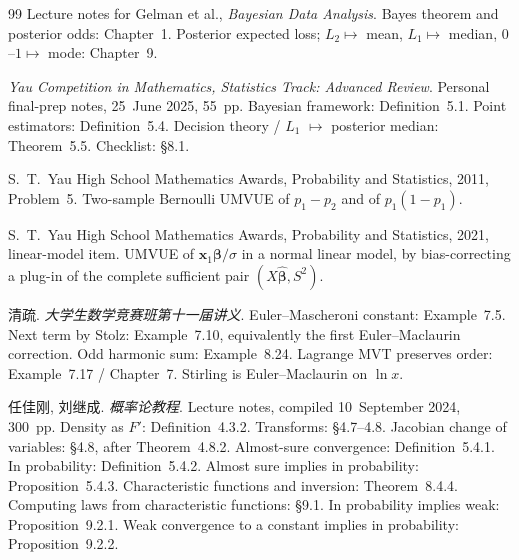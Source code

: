 \documentclass[11pt,a4paper]{article}
\begin{document}
\begin{thebibliography}{99}
Lecture notes for Gelman et al., \emph{Bayesian Data Analysis}.
\newblock Bayes theorem and posterior odds: Chapter~1. Posterior expected loss; \(L_2\mapsto\) mean, \(L_1\mapsto\) median, \(0\)--\(1\mapsto\) mode: Chapter~9.

\textit{Yau Competition in Mathematics, Statistics Track: Advanced Review}.
\newblock Personal final-prep notes, 25~June 2025, 55~pp.
\newblock Bayesian framework: Definition~5.1. Point estimators: Definition~5.4. Decision theory / \(L_1\) \(\mapsto\) posterior median: Theorem~5.5. Checklist: \S8.1.

S.~T.~Yau High School Mathematics Awards, Probability and Statistics, 2011, Problem~5.
\newblock Two-sample Bernoulli UMVUE of \(p_1-p_2\) and of \(p_1(1-p_1)\).

S.~T.~Yau High School Mathematics Awards, Probability and Statistics, 2021, linear-model item.
\newblock UMVUE of \(\mathbf{x}_1\boldsymbol{\beta}/\sigma\) in a normal linear model, by bias-correcting a plug-in of the complete sufficient pair \((X\hat{\boldsymbol{\beta}},S^2)\).

清疏.
\newblock \emph{大学生数学竞赛班第十一届讲义}.
\newblock Euler--Mascheroni constant: Example~7.5. Next term by Stolz: Example~7.10, equivalently the first Euler--Maclaurin correction. Odd harmonic sum: Example~8.24. Lagrange MVT preserves order: Example~7.17 / Chapter~7. Stirling is Euler--Maclaurin on \(\ln x\).

任佳刚, 刘继成.
\newblock \emph{概率论教程}.
\newblock Lecture notes, compiled 10~September 2024, 300~pp.
\newblock Density as \(F'\): Definition~4.3.2. Transforms: \S4.7--4.8. Jacobian change of variables: \S4.8, after Theorem~4.8.2. Almost-sure convergence: Definition~5.4.1. In probability: Definition~5.4.2. Almost sure implies in probability: Proposition~5.4.3. Characteristic functions and inversion: Theorem~8.4.4. Computing laws from characteristic functions: \S9.1. In probability implies weak: Proposition~9.2.1. Weak convergence to a constant implies in probability: Proposition~9.2.2.
\end{thebibliography}
\end{document}

